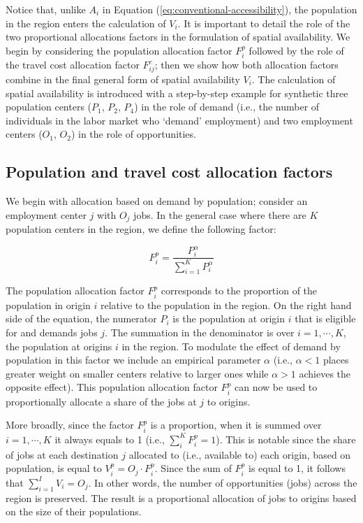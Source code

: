 \documentclass[]{elsarticle} %
\begin{document}
Notice that, unlike \(A_i\) in Equation
(\ref{eq:conventional-accessibility}), the population in the region
enters the calculation of \(V_{i}\). It is important to detail the role
of the two proportional allocations factors in the formulation of
spatial availability. We begin by considering the population allocation
factor \(F^p_{i}\) followed by the role of the travel cost allocation
factor \(F^c_{ij}\); then we show how both allocation factors combine in
the final general form of spatial availability \(V_{i}\). The
calculation of spatial availability is introduced with a step-by-step
example for synthetic three population centers (\(P_1\), \(P_2\),
\(P_4\)) in the role of demand (i.e., the number of individuals in the
labor market who `demand' employment) and two employment centers
(\(O_1\), \(O_2\)) in the role of opportunities.

\hypertarget{population-and-travel-cost-allocation-factors}{%
\subsection{Population and travel cost allocation
factors}\label{population-and-travel-cost-allocation-factors}}

We begin with allocation based on demand by population; consider an
employment center \(j\) with \(O_j\) jobs. In the general case where
there are \(K\) population centers in the region, we define the
following factor:

\begin{equation}
\label{eq:pop-alloc-factor}
F^p_{i} = \frac{P_{i}^\alpha}{\sum_{i=1}^K P_{i}^\alpha}
\end{equation}

The population allocation factor \(F^p_{i}\) corresponds to the
proportion of the population in origin \(i\) relative to the population
in the region. On the right hand side of the equation, the numerator
\(P_{i}\) is the population at origin \(i\) that is eligible for and
demands jobs \(j\). The summation in the denominator is over
\(i=1,\cdots,K\), the population at origins \(i\) in the region. To
modulate the effect of demand by population in this factor we include an
empirical parameter \(\alpha\) (i.e., \(\alpha <1\) places greater
weight on smaller centers relative to larger ones while \(\alpha>1\)
achieves the opposite effect). This population allocation factor
\(F^p_{i}\) can now be used to proportionally allocate a share of the
jobs at \(j\) to origins.

More broadly, since the factor \(F^p_{i}\) is a proportion, when it is
summed over \(i=1,\cdots,K\) it always equals to 1 (i.e.,
\(\sum_i^{K} F^p_{i} = 1\)). This is notable since the share of jobs at
each destination \(j\) allocated to (i.e., available to) each origin,
based on population, is equal to \(V^p_{i} = O_j \cdot F^p_{i}\). Since
the sum of \(F^p_{i}\) is equal to 1, it follows that
\(\sum_{i=1}^I V_{i} = O_j\). In other words, the number of
opportunities (jobs) across the region is preserved. The result is a
proportional allocation of jobs to origins based on the size of their
populations.
\end{document}
